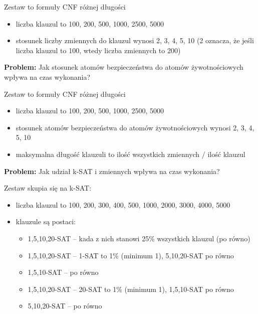 \documentclass[a4paper,12pt]{article}
\begin{document}
\begin{itemize}
Zestaw to formuły CNF różnej długości
\begin{itemize}
  \item liczba klauzul to 100, 200, 500, 1000, 2500, 5000
  \item stosunek liczby zmiennych do klauzul wynosi 2, 3, 4, 5, 10 (2 oznacza, że jeśli liczba klauzul to 100, wtedy liczba zmiennych to 200)
\end{itemize}

\noindent
\textbf{Problem:} Jak stosunek atomów bezpieczeństwa do atomów żywotnościowych wpływa na czas wykonania?

Zestaw to formuły CNF różnej długości
\begin{itemize}
  \item liczba klauzul to 100, 200, 500, 1000, 2500, 5000
  \item stosunek atomów bezpieczeństwa do atomów żywotnościowych wynosi 2, 3, 4, 5, 10
  \item maksymalna długość klauzuli to ilość wszystkich zmiennych / ilość klauzul
\end{itemize}

\noindent
\textbf{Problem:} Jak udział k-SAT i zmiennych wpływa na czas wykonania?
\newline

Zestaw skupia się na k-SAT:
\begin{itemize}
  \item liczba klauzul to 100, 200, 300, 400, 500, 1000, 2000, 3000, 4000, 5000
  \item klauzule są postaci:
    \begin{itemize}
      \item 1,5,10,20-SAT -- kada z nich stanowi 25\% wszystkich klauzul (po równo)
      \item 1,5,10,20-SAT -- 1-SAT to 1\% (minimum 1), 5,10,20-SAT po równo
      \item 1,5,10-SAT -- po równo
      \item 1,5,10,20-SAT -- 20-SAT to 1\% (minimum 1), 1,5,10-SAT po równo
      \item 5,10,20-SAT -- po równo
    \end{itemize}
\end{itemize}


\end{itemize}
\end{document}
